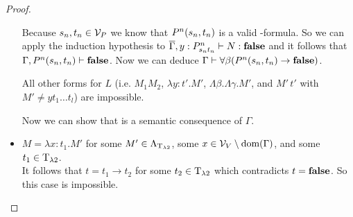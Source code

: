 \begin{proof}
\begin{itemize}
		\begin{figure}[H]
			\centering
			
		\end{figure}
		
		Because $\predTFst[n],\predTSnd[n]\in\VarP$ we know that $P^n(\predTFst[n],\predTSnd[n])$ is a valid \SysP-formula. So we can apply the induction hypothesis to $\trans{\Gamma},y:\code{P^n}{\predTFst[n]}{\predTSnd[n]}\lambdaModels N:\false$ and it follows that $\Gamma,P^n(\predTFst[n],\predTSnd[n])\PModels\false$. 
		Now we can deduce $\Gamma\PModels\forall\beta(P^n(\predTFst[n],\predTSnd[n])\to\false)$.
		
		\begin{figure}[H]
			\centering
			
		\end{figure}
		
		All other forms for $L$ (i.e. $M_1M_2$, $\lambda y:t'.M'$, $\Lambda\beta.\Lambda \gamma.M'$, and $M'\,t'$ with $M'\neq yt_1\dots t_l$) are impossible. %
		
		Now we can show that \false{} is a semantic consequence of $\Gamma$.
		
		\begin{figure}[H]
			\centering
			
		\end{figure}
		
	\item[] \underline{$M=\lambda x:t_1.M'$} for some $M'\in\Lambda_{\text{T}_{\lambda2}}$, some $x\in\mathcal{V}_V\setminus\text{dom}(\Gamma)$, and some $t_1\in\text{T}_{\lambda2}$.\\
		It follows that $t=t_1\to t_2$ for some $t_2\in\text{T}_{\lambda2}$ which contradicts $t=\textbf{false}$. So this case is impossible.


\end{itemize}
\end{proof}
